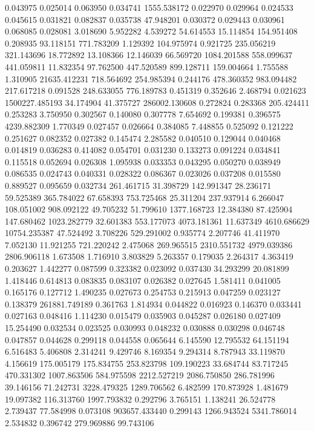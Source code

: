 0.043975
0.025014
0.063950
0.034741
1555.538172
0.022970
0.029964
0.024533
0.045615
0.031821
0.082837
0.035738
47.948201
0.030372
0.029443
0.030961
0.068085
0.028081
3.018690
5.952282
4.539272
54.614553
15.114854
154.951408
0.208935
93.118151
771.783209
1.129392
104.975974
0.921725
235.056219
321.143696
18.772892
13.108366
12.146039
66.569720
1084.201588
558.099637
441.059811
11.832354
97.762500
447.520589
899.128711
159.004664
1.755588
1.310905
21635.412231
718.564692
254.985394
0.244176
478.360352
983.094482
217.617218
0.091528
248.633055
776.189783
0.451319
0.352646
2.468794
0.021623
1500227.485193
34.174904
41.375727
286002.130608
0.272824
0.283368
205.424411
0.253283
3.750950
0.302567
0.140080
0.307778
7.654692
0.199381
0.396575
4239.882309
1.770349
0.027457
0.026664
0.384085
7.448855
0.525092
0.121222
0.251627
0.082352
0.027382
0.145474
2.285582
0.040510
0.129044
0.040468
0.014819
0.036283
0.414082
0.054701
0.031230
0.133273
0.091224
0.034841
0.115518
0.052694
0.026308
1.095938
0.033353
0.043295
0.050270
0.038949
0.086535
0.024743
0.040331
0.028322
0.086367
0.023026
0.037208
0.015580
0.889527
0.095659
0.032734
261.461715
31.398729
142.991347
28.236171
59.525389
365.784022
67.658393
753.725468
25.311204
237.937914
6.266047
108.051002
908.092122
49.705232
51.799610
1377.168723
12.384380
87.425904
147.680462
1023.282779
32.601383
553.177073
4073.181361
11.637349
4610.686629
10754.235387
47.524492
3.708226
529.291002
0.935774
2.207746
41.411970
7.052130
11.921255
721.220242
2.475068
269.965515
2310.551732
4979.039386
2806.906118
1.673508
1.716910
3.803829
5.263357
0.179035
2.264317
4.363419
0.203627
1.442277
0.087599
0.323382
0.023092
0.037430
34.293299
20.081899
1.418446
0.614813
0.083835
0.083107
0.026382
0.027645
1.581411
0.041005
0.165176
0.127712
1.490235
0.027673
0.254753
0.215913
0.047259
0.023127
0.138379
261881.749189
0.361763
1.814934
0.044822
0.016923
0.146370
0.033441
0.027163
0.048416
1.114230
0.015479
0.035903
0.045287
0.026180
0.027409
15.254490
0.032534
0.023525
0.030993
0.048232
0.030888
0.030298
0.046748
0.047857
0.044628
0.299118
0.044558
0.065644
6.145590
12.795532
64.151194
6.516483
5.406808
2.314241
9.429746
8.169354
9.294314
8.787943
33.119870
4.156619
175.005179
175.834755
253.823798
109.190223
33.684744
83.717245
470.331302
1007.863506
584.975598
2212.527219
2086.750850
286.781996
39.146156
71.242731
3228.479325
1289.706562
6.482599
170.873928
1.481679
19.097382
116.313760
1997.793832
0.292796
3.765151
1.138241
26.524778
2.739437
77.584998
0.073108
903657.433440
0.299143
1266.943524
5341.786014
2.534832
0.396742
279.969886
99.743106
